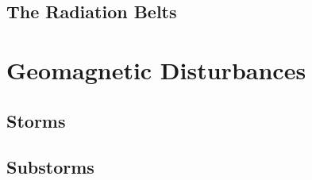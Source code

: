 \subsection{The Radiation Belts}

\section{Geomagnetic Disturbances}

\subsection{Storms}

\subsection{Substorms}






